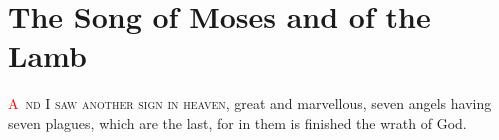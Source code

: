 
\chapter{The Song of Moses and of the Lamb}
\fancyhead{} %
\lettrine[lines=3,slope=0.5em]{\textcolor{red}{A}}{\ nd I saw another sign in heaven}, great and marvellous, seven angels having seven plagues,%
 which are the last, for in them is finished the wrath of God.
\newline

